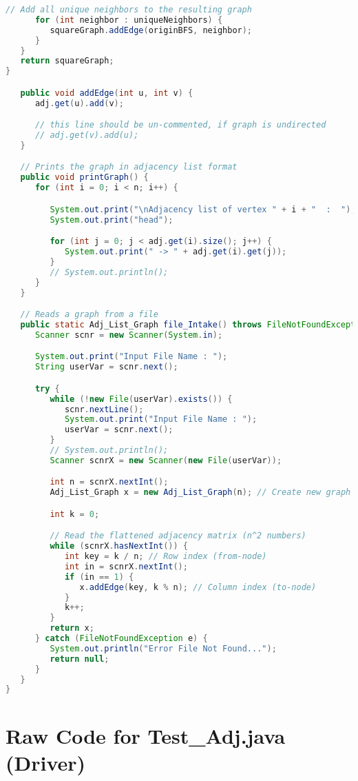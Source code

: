 \documentclass[11pt]{article}
\begin{document}
\begin{lstlisting}[language=Java]
      // Add all unique neighbors to the resulting graph
      for (int neighbor : uniqueNeighbors) {
         squareGraph.addEdge(originBFS, neighbor);
      }
   }
   return squareGraph;
}

   public void addEdge(int u, int v) {
      adj.get(u).add(v);

      // this line should be un-commented, if graph is undirected
      // adj.get(v).add(u);
   }

   // Prints the graph in adjacency list format
   public void printGraph() {
      for (int i = 0; i < n; i++) {

         System.out.print("\nAdjacency list of vertex " + i + "  :  ");
         System.out.print("head");

         for (int j = 0; j < adj.get(i).size(); j++) {
            System.out.print(" -> " + adj.get(i).get(j));
         }
         // System.out.println();
      }
   }

   // Reads a graph from a file
   public static Adj_List_Graph file_Intake() throws FileNotFoundException {
      Scanner scnr = new Scanner(System.in);

      System.out.print("Input File Name : ");
      String userVar = scnr.next();

      try {
         while (!new File(userVar).exists()) {
            scnr.nextLine();
            System.out.print("Input File Name : ");
            userVar = scnr.next();
         }
         // System.out.println();
         Scanner scnrX = new Scanner(new File(userVar));

         int n = scnrX.nextInt();
         Adj_List_Graph x = new Adj_List_Graph(n); // Create new graph

         int k = 0;

         // Read the flattened adjacency matrix (n^2 numbers)
         while (scnrX.hasNextInt()) {
            int key = k / n; // Row index (from-node)
            int in = scnrX.nextInt(); 
            if (in == 1) {
               x.addEdge(key, k % n); // Column index (to-node)
            }
            k++;
         }
         return x;
      } catch (FileNotFoundException e) {
         System.out.println("Error File Not Found...");
         return null;
      }
   }
}
\end{lstlisting}

\section*{Raw Code for Test\_Adj.java (Driver)}
\end{document}
